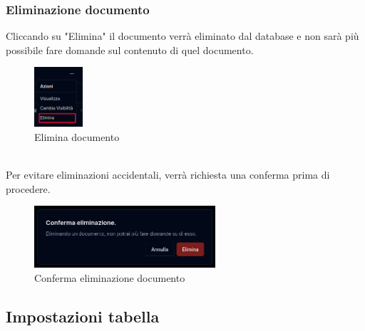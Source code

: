 \subsubsection{Eliminazione documento}
Cliccando su "Elimina" il documento verrà eliminato dal database e non sarà più possibile fare domande sul contenuto di quel documento.
\begin{figure}[h!]
    \centering
    \includegraphics[width=0.16\textwidth]{menuactiondocdelete.png}
    \caption{Elimina documento}\label{fig:deletedocs}
\end{figure}
\\Per evitare eliminazioni accidentali, verrà richiesta una conferma prima di procedere.
\begin{figure}[h!]
    \centering
    \includegraphics[width=0.6\textwidth]{confirmdeletedoc.png}
    \caption{Conferma eliminazione documento}\label{fig:dialogdelete}
\end{figure}   
\subsection{Impostazioni tabella}
